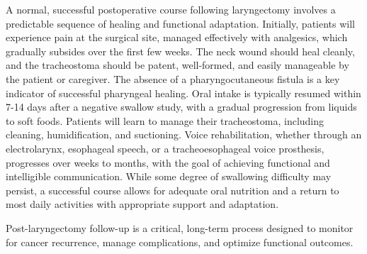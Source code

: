A normal, successful postoperative course following laryngectomy involves a predictable sequence of healing and functional adaptation. Initially, patients will experience pain at the surgical site, managed effectively with analgesics, which gradually subsides over the first few weeks. The neck wound should heal cleanly, and the tracheostoma should be patent, well-formed, and easily manageable by the patient or caregiver. The absence of a pharyngocutaneous fistula is a key indicator of successful pharyngeal healing. Oral intake is typically resumed within 7-14 days after a negative swallow study, with a gradual progression from liquids to soft foods. Patients will learn to manage their tracheostoma, including cleaning, humidification, and suctioning. Voice rehabilitation, whether through an electrolarynx, esophageal speech, or a tracheoesophageal voice prosthesis, progresses over weeks to months, with the goal of achieving functional and intelligible communication. While some degree of swallowing difficulty may persist, a successful course allows for adequate oral nutrition and a return to most daily activities with appropriate support and adaptation.

Post-laryngectomy follow-up is a critical, long-term process designed to monitor for cancer recurrence, manage complications, and optimize functional outcomes.

